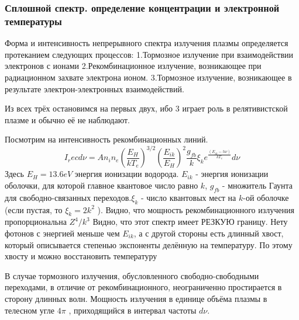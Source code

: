 \documentclass[10pt, a4paper]{article}
\begin{document}
\subsubsection{Сплошной спектр. определение концентрации и электронной температуры}
\label{11.2.4}
Форма и интенсивность непрерывного спектра излучения плазмы определяется протеканием следующих процессов:
1.Тормозное излучение при взаимодействии электронов с ионами
2.Рекомбинационное излучение, возникающее при радиационном захвате электрона ионом.
3.Тормозное излучение, возникающее в результате электрон-электронных взаимодействий.

Из всех трёх остановимся на первых двух, ибо 3 играет роль в релятивистской плазме и обычно её не наблюдают.

Посмотрим на интенсивность рекомбинационных линий.
\begin{equation}
	I_rec d\nu = A n_i n_e (\frac{E_H}{kT_e})^{3/2} (\frac{E_{ik}}{E_H})^{2} \frac{g_{fb}}{k} \xi_k e^{\frac{(E_{ik}-h \nu)}{kT_e}} d\nu 
\end{equation}
Здесь $E_H = 13.6 eV$ энергия ионизации водорода. $E_{ik}$ - энергия ионизации оболочки, для которой главное квантовое число равно $k$, $g_{fb}$ - множитель Гаунта для свободно-связанных переходов.$ \xi_k$ - число квантовых мест на $k$-ой оболочке (если пустая, то $ \xi_k = 2k^{2}$ ). 
Видно, что мощность рекомбинационного излучения пропорциональна $Z^{4}/k^3$
Видно, что этот спектр имеет РЕЗКУЮ границу. Нету фотонов с энергией меньше чем $E_{ik}$, а с другой стороны есть длинный хвост, который описывается степенью экспоненты делённую на температуру. По этому хвосту и можно восстановить температуру

\begin{figure}[h!]
\end{figure}

В случае тормозного излучения, обусловленного свободно-свободными переходами, в отличие от рекомбинационного, неограниченно простирается в сторону длинных волн. Мощность излучения в единице объёма плазмы в телесном угле $4 \pi$ , приходящийся в интервал частоты $d\nu$.
\end{document}
